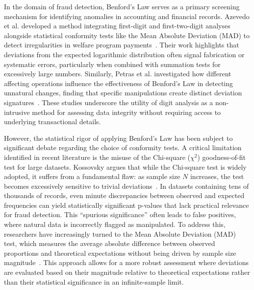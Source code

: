 \documentclass[11pt,a4paper]{article}
\begin{document}
In the domain of fraud detection, Benford's Law serves as a primary screening mechanism for identifying anomalies in accounting and financial records. Azevedo et al. developed a method integrating first-digit and first-two-digit analyses alongside statistical conformity tests like the Mean Absolute Deviation (MAD) to detect irregularities in welfare program payments~\cite{Azevedo2021ABL}. Their work highlights that deviations from the expected logarithmic distribution often signal fabrication or systematic errors, particularly when combined with summation tests for excessively large numbers. Similarly, Petras et al. investigated how different affecting operations influence the effectiveness of Benford's Law in detecting unnatural changes, finding that specific manipulations create distinct deviation signatures~\cite{Petras2025DetectingBL}. These studies underscore the utility of digit analysis as a non-intrusive method for assessing data integrity without requiring access to underlying transactional details.

However, the statistical rigor of applying Benford's Law has been subject to significant debate regarding the choice of conformity tests. A critical limitation identified in recent literature is the misuse of the Chi-square ($\chi^2$) goodness-of-fit test for large datasets. Kossovsky argues that while the Chi-square test is widely adopted, it suffers from a fundamental flaw: as sample size $N$ increases, the test becomes excessively sensitive to trivial deviations~\cite{Kossovsky2021OnTM}. In datasets containing tens of thousands of records, even minute discrepancies between observed and expected frequencies can yield statistically significant p-values that lack practical relevance for fraud detection. This ``spurious significance'' often leads to false positives, where natural data is incorrectly flagged as manipulated. To address this, researchers have increasingly turned to the Mean Absolute Deviation (MAD) test, which measures the average absolute difference between observed proportions and theoretical expectations without being driven by sample size magnitude~\cite{Durtschi2004TheEU}. This approach allows for a more robust assessment where deviations are evaluated based on their magnitude relative to theoretical expectations rather than their statistical significance in an infinite-sample limit.
\end{document}
